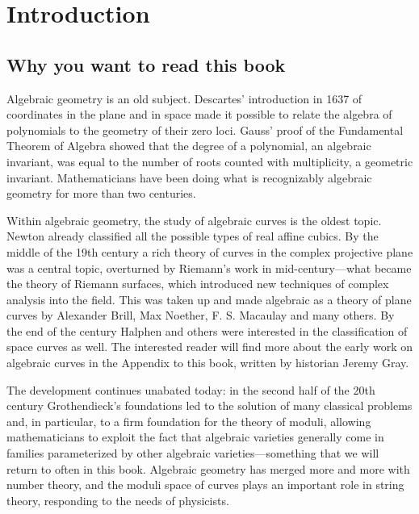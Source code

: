 

\setlength{\parskip}{5pt}

\addtocounter{chapter}{-1}
\chapter{Introduction}
\label{IntroChapter}

\section{Why you want to read this book}

Algebraic geometry is an old subject. Descartes' introduction in 1637 of coordinates in the plane and in space made it possible to relate the algebra of polynomials to the geometry of their zero loci. Gauss' proof of the Fundamental Theorem of Algebra showed that the degree of a polynomial, an algebraic invariant, was equal to the number of roots counted with multiplicity, a geometric invariant. Mathematicians have been doing what is recognizably algebraic geometry for more than two centuries.

Within algebraic geometry, the study of algebraic curves is the oldest topic. Newton already classified all the possible types of real affine cubics. By the middle of
the 19th century a rich theory of curves in the complex projective plane was a central topic, overturned by Riemann's work in mid-century---what became the theory of Riemann surfaces, which introduced new techniques of complex analysis into the field. This was  taken up and made algebraic as a theory of plane curves by Alexander Brill, Max Noether, F. S. Macaulay and many others. By the end of the century Halphen and others were interested in the classification of space curves as well. The interested reader will find more about the
early work on algebraic curves in the Appendix to this book, written by historian Jeremy Gray.

The development continues unabated today: in the second half of the 20th century Grothendieck's foundations led to the solution of many classical problems and, in particular, to a firm foundation for the theory of moduli, allowing mathematicians to exploit the fact that algebraic varieties generally come in families parameterized by other algebraic varieties---something that we will return to often in this book. Algebraic geometry has merged more and more with number theory, and the moduli space of curves plays an important role in string theory, responding to the needs of physicists.

